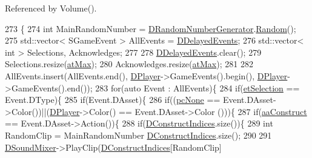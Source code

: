 Referenced by Volume().


\begin{DoxyCode}
273                                                                     \{
274     \textcolor{keywordtype}{int} MainRandomNumber = \hyperlink{classCSoundEventRenderer_a591b9430a0f6a70259f87a2467de908f}{DRandomNumberGenerator}.\hyperlink{classCRandomNumberGenerator_aa7fc51bde5647d15df2f1b9826702ca2}{Random}();
275     std::vector< SGameEvent > AllEvents = \hyperlink{classCSoundEventRenderer_a896d5c4717b407fdb6567aed87da3e50}{DDelayedEvents};
276     std::vector< int > Selections, Acknowledges;
277     
278     \hyperlink{classCSoundEventRenderer_a896d5c4717b407fdb6567aed87da3e50}{DDelayedEvents}.clear();
279     Selections.resize(\hyperlink{GameDataTypes_8h_a5600d4fc433b83300308921974477feca92fbf60b4e5c335160f915b6a1c17c05}{atMax});
280     Acknowledges.resize(\hyperlink{GameDataTypes_8h_a5600d4fc433b83300308921974477feca92fbf60b4e5c335160f915b6a1c17c05}{atMax});
281     
282     AllEvents.insert(AllEvents.end(), \hyperlink{classCSoundEventRenderer_ad98889d7f52477a2e148d7e390641d51}{DPlayer}->GameEvents().begin(), 
      \hyperlink{classCSoundEventRenderer_ad98889d7f52477a2e148d7e390641d51}{DPlayer}->GameEvents().end());
283     \textcolor{keywordflow}{for}(\textcolor{keyword}{auto} Event : AllEvents)\{
284         \textcolor{keywordflow}{if}(\hyperlink{GameModel_8h_abfcf510bafec7c6429906a6ecaac656da38393c2ecd9404ab15f2f9bb5aab0497}{etSelection} == Event.DType)\{
285             \textcolor{keywordflow}{if}(Event.DAsset)\{
286                 \textcolor{keywordflow}{if}((\hyperlink{GameDataTypes_8h_aafb0ca75933357ff28a6d7efbdd7602fa88767aa8e02c7b3192bbab4127b3d729}{pcNone} == Event.DAsset->Color())||(\hyperlink{classCSoundEventRenderer_ad98889d7f52477a2e148d7e390641d51}{DPlayer}->Color() == Event.DAsset->Color
      ()))\{
287                     \textcolor{keywordflow}{if}(\hyperlink{GameDataTypes_8h_ab47668e651a3032cfb9c40ea2d60d670a7ef6b863f66dd7dcc95a199cd758ae1d}{aaConstruct} == Event.DAsset->Action())\{
288                         \textcolor{keywordflow}{if}(\hyperlink{classCSoundEventRenderer_ad49edcbf2abf0ecef518c843475098e2}{DConstructIndices}.size())\{
289                             \textcolor{keywordtype}{int} RandomClip = MainRandomNumber %
      \hyperlink{classCSoundEventRenderer_ad49edcbf2abf0ecef518c843475098e2}{DConstructIndices}.size();
290                             
291                             \hyperlink{classCSoundEventRenderer_a5abf598a7e8783d9cc78e0d33a65c9c2}{DSoundMixer}->PlayClip(\hyperlink{classCSoundEventRenderer_ad49edcbf2abf0ecef518c843475098e2}{DConstructIndices}[RandomClip]

\end{DoxyCode}
